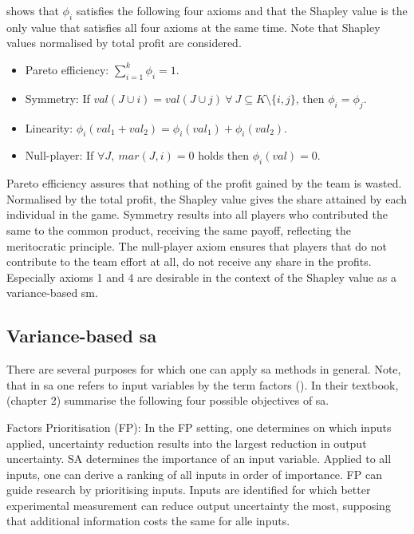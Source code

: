 \cite{S53} shows that $\phi_i$ satisfies the following four axioms and that the Shapley value is the only value that satisfies all four axioms at the same time. Note that Shapley values normalised by total profit are considered.

\begin{itemize}
    \item Pareto efficiency: $\sum_{i=1}^{k}\phi_i=1$.
	\item Symmetry: If $val(J \cup {i})=val(J \cup {j})\ \forall\ J \subseteq K \setminus{\{i, j\}}$, then $\phi_i = \phi_j$.
	\item Linearity: $\phi_i(val_1 + val_2)=\phi_i(val_1)+\phi_i(val_2)$.
	\item Null-player: If $\forall J,\ mar(J, i) = 0$ holds then $\phi_i(val) = 0$.
\end{itemize}

Pareto efficiency assures that nothing of the profit gained by the team is wasted. Normalised by the total profit, the Shapley value gives the share attained by each individual in the game. Symmetry results into all players who contributed the same to the common product, receiving the same payoff, reflecting the meritocratic principle. The null-player axiom ensures that players that do not contribute to the team effort at all, do not receive any share in the profits. Especially axioms 1 and 4 are desirable in the context of the Shapley value as a variance-based sm.

\subsection{Variance-based sa} \label{var_based_sa}

There are several purposes for which one can apply sa methods in general. Note, that in sa one refers to input variables by the term factors (\cite{R21}). In their textbook, \cite{STC04} (chapter 2) summarise the following four possible objectives of sa.

Factors Prioritisation (FP): In the FP setting, one determines on which inputs applied, uncertainty reduction results into the largest reduction in output uncertainty. SA determines the importance of an input variable. Applied to all inputs, one can derive a ranking of all inputs in order of importance. FP can guide research by prioritising inputs. Inputs are identified for which better experimental measurement can reduce output uncertainty the most, supposing that additional information costs the same for alle inputs.

